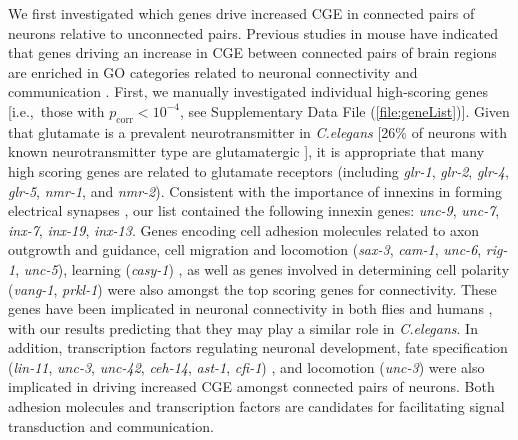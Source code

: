 {We first investigated which genes drive increased CGE in connected pairs of neurons relative to unconnected pairs.
Previous studies in mouse have indicated that genes driving an increase in CGE between connected pairs of brain regions are enriched in GO categories related to neuronal connectivity and communication \citep{Fulcher2016, Ji2014, Fakhry2015a, French2011}.
First, we manually investigated individual high-scoring genes \mbox{[i.e., those} with $p_\mathrm{corr} < 10^{-4}$, see Supplementary Data File (\ref{file:geneList})].
Given that glutamate is a prevalent neurotransmitter in \textit{C.elegans} [26\% of neurons with known neurotransmitter type are glutamatergic \citep{Pereira2015}], it is appropriate that many high scoring genes are related to glutamate receptors (including \emph{glr-1}, \emph{glr-2}, \emph{glr-4}, \emph{glr-5}, \emph{nmr-1}, and \emph{nmr-2}).
Consistent with the importance of innexins in forming electrical synapses \citep{Starich2001}, our list contained the following innexin genes: \emph{unc-9}, \emph{unc-7}, \emph{inx-7}, \emph{inx-19}, \emph{inx-13}.
Genes encoding cell adhesion molecules related to axon outgrowth and guidance, cell migration and locomotion (\emph{sax-3}, \emph{cam-1}, \emph{unc-6}, \emph{rig-1}, \emph{unc-5}), learning (\emph{casy-1}) \citep{Zallen1999, Garriga1999, Leung-Hagesteijn1992, Harris2010, Ikeda2008},
as well as genes involved in determining cell polarity (\emph{vang-1}, \emph{prkl-1}) \citep{Wu2006, Hoffmann2010} were also amongst the top scoring genes for connectivity.
These genes have been implicated in neuronal connectivity in both flies and humans \citep{Paemka2013, Ehaideb2016, Sowers2013}, with our results predicting that they may play a similar role in \textit{C.elegans}.
In addition, transcription factors regulating neuronal development,
fate specification (\emph{lin-11}, \emph{unc-3}, \emph{unc-42}, \emph{ceh-14}, \emph{ast-1}, \emph{cfi-1}) \citep{Sarafi-Reinach2001, Prasad2008, Baran1999, Cassata2000, Schmid2006, Shaham2002a},
and locomotion (\emph{unc-3}) \citep{Prasad2008} were also implicated in driving increased CGE amongst connected pairs of neurons.
Both adhesion molecules and transcription factors are candidates for facilitating signal transduction and communication.

}
